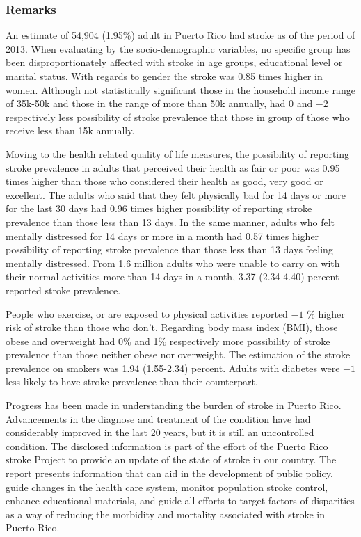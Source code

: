  \subsubsection{Remarks}

An estimate of 54,904 
(1.95\%) adult in Puerto Rico had stroke as of the period of 2013.
When evaluating by the socio-demographic variables, no specific group has been disproportionately affected with stroke in age groups, educational level or marital status. With regards to gender the stroke was 0.85 times higher in women. Although not statistically significant those in the household income range of 35k-50k and those in the range of more than 50k annually, had 0 and \ensuremath{-2} respectively less possibility of stroke prevalence that those  in group of those who receive less than 15k annually.

Moving to the health related quality of life measures, the possibility of reporting stroke prevalence in adults that perceived their health as fair or poor was 0.95 times higher than those who considered their health as good, very good or excellent. The adults who said that they felt physically bad for 14 days or more for the last 30 days had 0.96 times higher possibility of reporting stroke prevalence than those less than 13 days. In the same manner, adults who felt mentally distressed for 14 days or more in a month had 0.57 times higher possibility of reporting stroke prevalence than those less than 13 days feeling mentally distressed. From 1.6 million adults who were unable to carry on with their normal activities more than 14 days in a month, 3.37 (2.34-4.40) percent reported stroke prevalence. 

People who exercise, or are exposed to physical activities reported \ensuremath{-1} \% higher risk of stroke than those who don't.  Regarding body mass index (BMI), those obese and overweight had 0\% and 1\% respectively more possibility of stroke prevalence than those neither obese nor overweight. The estimation of the stroke prevalence on smokers was 1.94 (1.55-2.34) percent.  Adults with diabetes were \ensuremath{-1}\5 less likely to have stroke prevalence than their counterpart.



Progress has been made in understanding the burden of stroke in Puerto Rico. Advancements in the diagnose and treatment of the condition have had considerably improved in the last 20 years, but it is still an uncontrolled condition. The disclosed information is part of the effort of the Puerto Rico stroke Project to provide an update of the state of stroke in our country. The report presents information that can aid in the development of public policy, guide changes in the health care system, monitor population stroke control, enhance educational materials, and guide all efforts to target factors of disparities as a way of reducing the morbidity and mortality associated with stroke in Puerto Rico.

